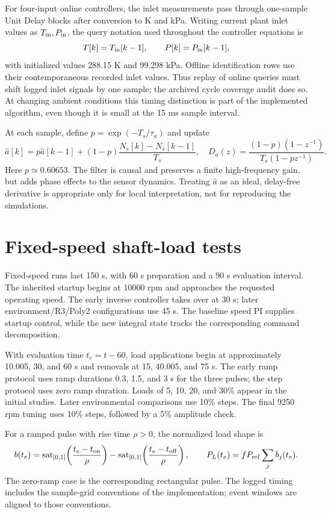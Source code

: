 \documentclass[11pt,a4paper,oneside]{report}
\newcommand{\sat}{\operatorname{sat}}
\begin{document}
For four-input online controllers, the inlet measurements pass through one-sample Unit Delay blocks after conversion to K and kPa. Writing current plant inlet values as $T_{\rm in},P_{\rm in}$, the query notation used throughout the controller equations is
\begin{equation}
T[k]=T_{\rm in}[k-1],\qquad P[k]=P_{\rm in}[k-1],
\end{equation}
with initialized values 288.15 K and 99.298 kPa. Offline identification rows use their contemporaneous recorded inlet values. Thus replay of online queries must shift logged inlet signals by one sample; the archived cycle coverage audit does so. At changing ambient conditions this timing distinction is part of the implemented algorithm, even though it is small at the 15 ms sample interval.

At each sample, define $p=\exp(-T_s/\tau_a)$ and update
\begin{equation}
\hat a[k]=p\hat a[k-1]+(1-p)\frac{N_s[k]-N_s[k-1]}{T_s},\quad
D_a(z)=\frac{(1-p)(1-z^{-1})}{T_s(1-pz^{-1})}.
\label{eq:filter}
\end{equation}
Here $p\simeq0.60653$. The filter is causal and preserves a finite high-frequency gain, but adds phase effects to the sensor dynamics. Treating $\hat a$ as an ideal, delay-free derivative is appropriate only for local interpretation, not for reproducing the simulations.

\section{Fixed-speed shaft-load tests}
Fixed-speed runs last 150 s, with 60 s preparation and a 90 s evaluation interval. The inherited startup begins at 10000 rpm and approaches the requested operating speed. The early inverse controller takes over at 30 s; later environment/R3/Poly2 configurations use 45 s. The baseline speed PI supplies startup control, while the new integral state tracks the corresponding command decomposition.

With evaluation time $t_e=t-60$, load applications begin at approximately 10.005, 30, and 60 s and removals at 15, 40.005, and 75 s. The early ramp protocol uses ramp durations 0.3, 1.5, and 3 s for the three pulses; the step protocol uses zero ramp duration. Loads of 5, 10, 20, and 30\% appear in the initial studies. Later environmental comparisons use 10\% steps. The final 9250 rpm tuning uses 10\% steps, followed by a 5\% amplitude check.

For a ramped pulse with rise time $\rho>0$, the normalized load shape is
\begin{equation}
b(t_e)=\sat_{[0,1]}\!\left(\frac{t_e-t_{\rm on}}{\rho}\right)
-\sat_{[0,1]}\!\left(\frac{t_e-t_{\rm off}}{\rho}\right),\qquad
P_L(t_e)=f P_{\rm ref}\sum_j b_j(t_e).
\end{equation}
The zero-ramp case is the corresponding rectangular pulse. The logged timing includes the sample-grid conventions of the implementation; event windows are aligned to those conventions.
\end{document}
